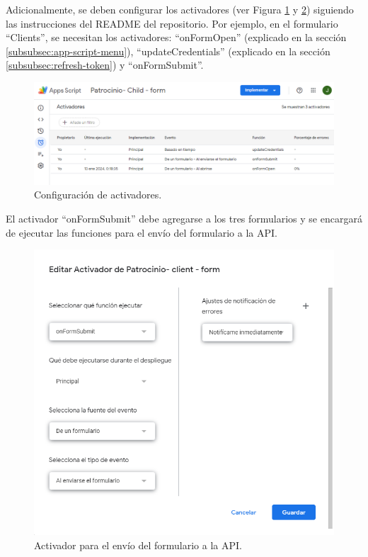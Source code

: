 Adicionalmente, se deben configurar los activadores (ver Figura \ref{fig:activadores} y \ref{fig:activador-api-send-form}) siguiendo las instrucciones del README del repositorio. Por ejemplo, en el formulario ``Clients'', se necesitan los activadores: ``onFormOpen'' (explicado en la sección \ref{subsubsec:app-script-menu}), ``updateCredentials'' (explicado en la sección \ref{subsubsec:refresh-token}) y ``onFormSubmit''.

\begin{figure}[H]
\centering
\includegraphics[width=0.90\linewidth]{fig/activadores.png}
\caption{Configuración de activadores.}
\label{fig:activadores}
\end{figure}

El activador ``onFormSubmit'' debe agregarse a los tres formularios y se encargará de ejecutar las funciones para el envío del formulario a la API.

\begin{figure}[H]
\centering
\includegraphics[width=0.75\linewidth]{fig/activador-api-send-form.png}
\caption{Activador para el envío del formulario a la API.}
\label{fig:activador-api-send-form}
\end{figure}





